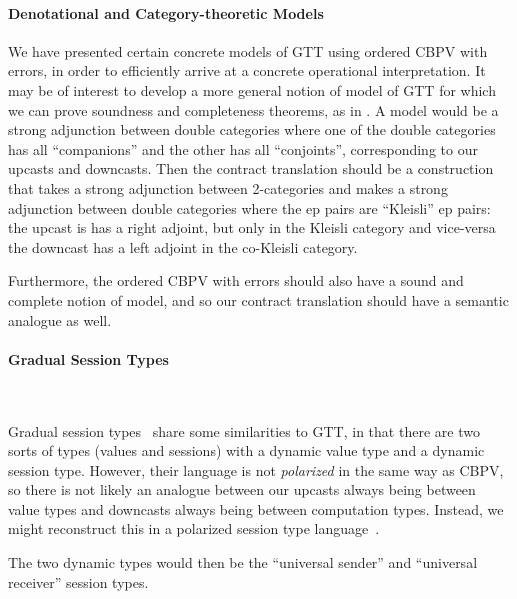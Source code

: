 \documentclass[acmsmall,nonacm]{acmart}
\renewcommand{\u}{\underline}
\begin{document}
{%


\begin{longonly}
\paragraph{Denotational and Category-theoretic Models}

We have presented certain concrete models of GTT using ordered CBPV
with errors, in order to efficiently arrive at a concrete operational
interpretation.
%
It may be of interest to develop a more general notion of model of GTT
for which we can prove soundness and completeness theorems, as in
\citet{newlicata2018-fscd}.
%
A model would be a strong adjunction between double categories where
one of the double categories has all ``companions'' and the other has
all ``conjoints'', corresponding to our upcasts and downcasts.
%
Then the contract translation should be a construction that takes a
strong adjunction between 2-categories and makes a strong adjunction
between double categories where the ep pairs are ``Kleisli'' ep pairs:
the upcast is has a right adjoint, but only in the Kleisli category and
vice-versa the downcast has a left adjoint in the co-Kleisli category.

Furthermore, the ordered CBPV with errors should also have a sound and
complete notion of model, and so our contract translation should have
a semantic analogue as well.
\end{longonly}

\begin{longonly}
  \paragraph{Gradual Session Types} ~
\end{longonly}
Gradual session types~\cite{igarashi+17gradualsession} share some
similarities to GTT, in that there are two sorts of types (values and
sessions) with a dynamic value type and a dynamic session type.
However, their language is not \emph{polarized} in the same way as CBPV,
so there is not likely an analogue between our upcasts always being
between value types and downcasts always being between computation
types.  Instead, we might reconstruct this in a polarized session
type language~\cite{pfenninggriffith15session}.
\begin{longonly}
The two dynamic types would then be the ``universal sender'' and
``universal receiver'' session types.
\end{longonly}

}
\end{document}
